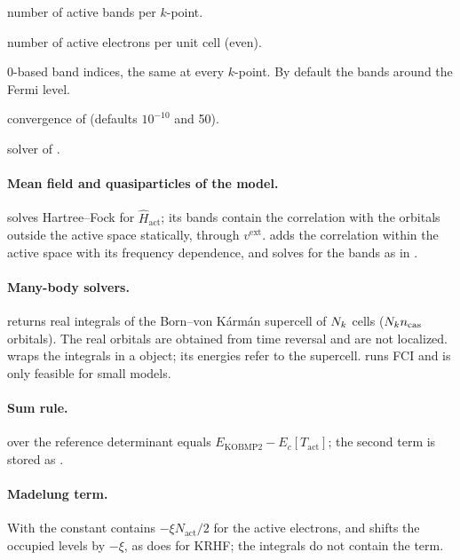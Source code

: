 \begin{description}[style=nextline,leftmargin=3.2cm,labelwidth=3cm]
  \item[\code{ncas}] number of active bands per $k$-point.
  \item[\code{nelecas}] number of active electrons per unit cell (even).
  \item[\code{cas_list}] 0-based band indices, the same at every $k$-point.
        By default the  bands around the Fermi level.
  \item[\code{conv_tol}, \code{max_cycle}] convergence of 
        (defaults $10^{-10}$ and 50).
  \item[\code{fcisolver}] solver of .
\end{description}

\paragraph{Mean field and quasiparticles of the model.}  solves
Hartree--Fock for $\hat H_{\mathrm{act}}$; its bands contain the correlation
with the orbitals outside the active space statically, through
$v^{\mathrm{ext}}$.  adds the correlation within the
active space with its frequency dependence, and
 solves for the bands as in .

\paragraph{Many-body solvers.}  returns real integrals of
the Born--von K\'arm\'an supercell of $N_k$ cells ($N_k n_{\mathrm{cas}}$
orbitals). The real orbitals are obtained from time reversal and are not
localized.  wraps the integrals in a \pyscf{} 
object; its energies refer to the supercell.  runs FCI and is
only feasible for small models.

\paragraph{Sum rule.}  over the reference determinant
equals $E_{\mathrm{KOBMP2}}-E_c[T_{\mathrm{act}}]$; the second term is stored
as .

\paragraph{Madelung term.} With  the constant contains
$-\xi N_{\mathrm{act}}/2$ for the active electrons, and 
shifts the occupied levels by $-\xi$, as \pyscf{} does for KRHF; the
integrals do not contain the term.

